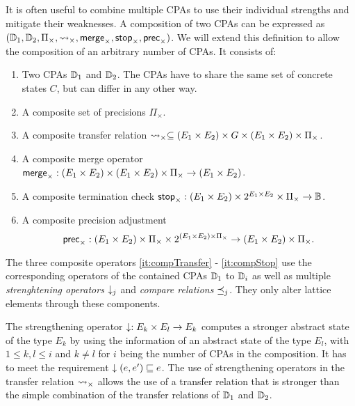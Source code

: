 \subsection{\CompositeCPA}
It is often useful to combine multiple CPAs to use their individual strengths and mitigate their weaknesses.
A composition of two CPAs \cite{Beyer2008} can be expressed as $(\mathbb{D}_1, \mathbb{D}_2, \Pi_\times, \rightsquigarrow_\times, \operatorname{\operatorname{\mathsf{merge}}}_\times, \operatorname{\operatorname{\mathsf{stop}}}_\times, \operatorname{\operatorname{\mathsf{prec}}}_\times)$.
We will extend this definition to allow the composition of an arbitrary number of CPAs.
It consists of:
\begin{enumerate}[leftmargin=*, label=\arabic*.]

\item Two CPAs $\mathbb{D}_1$ and $\mathbb{D}_2$. The CPAs have to share the same set of concrete states $C$, but can differ in any other way.
\item A composite set of precisions $\Pi_\times$.
\item \label{it:compTransfer} A composite transfer relation $\rightsquigarrow_\times \subseteq (E_1 \times E_2) \times G \times (E_1 \times E_2) \times \Pi_\times$.
\item \label{it:compMerge} A composite merge operator $\operatorname{\operatorname{\mathsf{merge}}}_\times : (E_1 \times E_2) \times (E_1 \times E_2) \times \Pi_\times \rightarrow (E_1 \times E_2)$.
\item \label{it:compStop} A composite termination check $\operatorname{\operatorname{\mathsf{stop}}}_\times : (E_1 \times E_2) \times 2^{E_1 \times E_2} \times \Pi_\times \rightarrow \mathbb{B}$.
\item A composite precision adjustment \[\operatorname{\operatorname{\mathsf{prec}}}_\times : (E_1 \times E_2) \times \Pi_\times \times 2^{(E_1 \times E_2) \times \Pi_\times} \rightarrow (E_1 \times E_2) \times \Pi_\times.\]
\end{enumerate}
The three composite operators \ref{it:compTransfer} - \ref{it:compStop} use the corresponding operators of the contained CPAs $\mathbb{D}_1$ to $\mathbb{D}_i$ as well as multiple \emph{strenghtening operators} $\downarrow_j$ and \emph{compare relations} $\preceq_j$. They only alter lattice elements through these components.

The strengthening operator $\downarrow : E_k \times E_l \rightarrow E_k$ computes a stronger abstract state of the type $E_k$ by using the information of an abstract state of the type $E_l$,
with $1 \leq k,l \leq i$ and $k \neq l$ for $i$ being the number of CPAs in the composition.
It has to meet the requirement $\downarrow(e, e') \sqsubseteq e$.
The use of strengthening operators in the transfer relation $\rightsquigarrow_\times$ allows the use of a transfer relation that is stronger than the simple combination of the transfer relations of $\mathbb{D}_1$ and $\mathbb{D}_2$.

